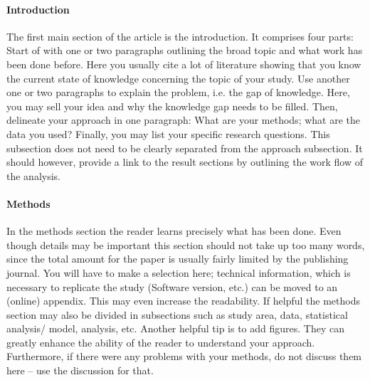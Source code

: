 \documentclass{tufte-book}
\begin{document}
\paragraph{Introduction}
The first main section of the article is the introduction. %
It comprises four parts: Start of with one or two paragraphs outlining the broad topic and what work has been done before. Here you usually cite a lot of literature showing that you know the current state of knowledge concerning the topic of your study.
Use another one or two paragraphs to explain the problem, i.e. the gap of knowledge. Here, you may sell your idea and why the knowledge gap needs to be filled.
Then, delineate your approach in one paragraph: What are your methods; what are the data you used?
Finally, you may list your specific research questions. This subsection does not need to be clearly separated from the approach subsection. It should however, provide a link to the result sections by outlining the work flow of the analysis.\\

\paragraph{Methods}
In the methods section %
the reader learns precisely what has been done. Even though details may be important this section should not take up too many words, since the total amount for the paper is usually fairly limited by the publishing journal. You will have to make a selection here; technical information, which is necessary to replicate the study (Software version, etc.) can be moved to an (online) appendix. This may even increase the readability. If helpful the methods section may also be divided in subsections such as study area, data, statistical analysis/ model, analysis, etc. Another helpful tip is to add figures. They can greatly enhance the ability of the reader to understand your approach. Furthermore, if there were any problems with your methods, do not discuss them here -- use the discussion for that.\\
\end{document}
